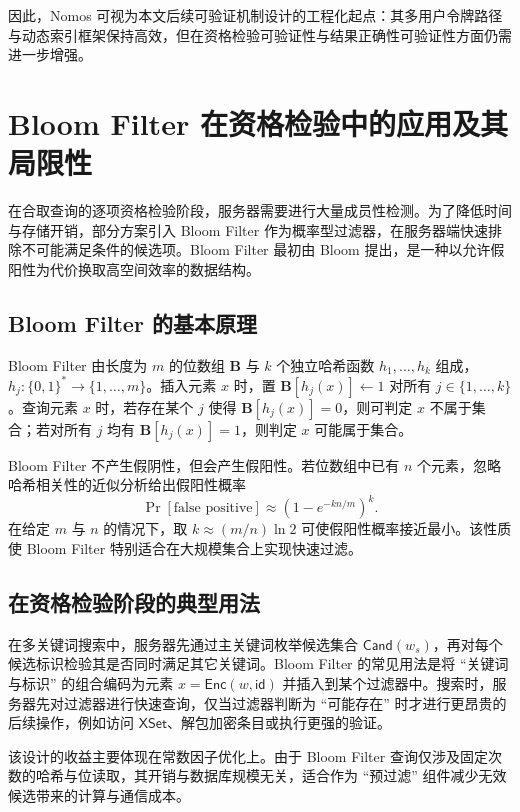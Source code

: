 因此，Nomos 可视为本文后续可验证机制设计的工程化起点：其多用户令牌路径与动态索引框架保持高效，但在资格检验可验证性与结果正确性可验证性方面仍需进一步增强。

\section{Bloom Filter 在资格检验中的应用及其局限性}
在合取查询的逐项资格检验阶段，服务器需要进行大量成员性检测。为了降低时间与存储开销，部分方案引入 Bloom Filter 作为概率型过滤器，在服务器端快速排除不可能满足条件的候选项。Bloom Filter 最初由 Bloom 提出，是一种以允许假阳性为代价换取高空间效率的数据结构。\cite{bloom1970}

\subsection{Bloom Filter 的基本原理}
Bloom Filter 由长度为 $m$ 的位数组 $\mathbf{B}$ 与 $k$ 个独立哈希函数 $h_1,\ldots,h_k$ 组成，$h_j:\{0,1\}^*\rightarrow \{1,\ldots,m\}$。插入元素 $x$ 时，置 $\mathbf{B}[h_j(x)]\leftarrow 1$ 对所有 $j\in\{1,\ldots,k\}$。查询元素 $x$ 时，若存在某个 $j$ 使得 $\mathbf{B}[h_j(x)]=0$，则可判定 $x$ 不属于集合；若对所有 $j$ 均有 $\mathbf{B}[h_j(x)]=1$，则判定 $x$ 可能属于集合。

Bloom Filter 不产生假阴性，但会产生假阳性。若位数组中已有 $n$ 个元素，忽略哈希相关性的近似分析给出假阳性概率
\begin{equation}
\Pr[\text{false positive}] \approx \left(1-e^{-kn/m}\right)^k.
\end{equation}
在给定 $m$ 与 $n$ 的情况下，取 $k\approx (m/n)\ln 2$ 可使假阳性概率接近最小。该性质使 Bloom Filter 特别适合在大规模集合上实现快速过滤。\cite{bloom1970}

\subsection{在资格检验阶段的典型用法}
在多关键词搜索中，服务器先通过主关键词枚举候选集合 $\mathsf{Cand}(w_s)$，再对每个候选标识检验其是否同时满足其它关键词。Bloom Filter 的常见用法是将 ``关键词与标识'' 的组合编码为元素 $x=\mathsf{Enc}(w,\mathsf{id})$ 并插入到某个过滤器中。搜索时，服务器先对过滤器进行快速查询，仅当过滤器判断为 ``可能存在'' 时才进行更昂贵的后续操作，例如访问 $\mathsf{XSet}$、解包加密条目或执行更强的验证。

该设计的收益主要体现在常数因子优化上。由于 Bloom Filter 查询仅涉及固定次数的哈希与位读取，其开销与数据库规模无关，适合作为 ``预过滤'' 组件减少无效候选带来的计算与通信成本。

